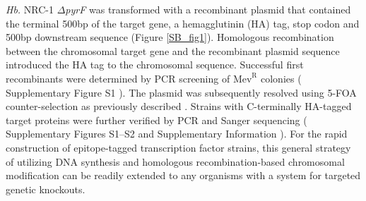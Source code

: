 {\em Hb.} NRC-1 $\Delta${\em pyrF} was transformed with a recombinant plasmid that contained the terminal 500bp of the target gene, a hemagglutinin (HA) tag, stop codon and 500bp downstream sequence (Figure \ref{SB_fig1}). Homologous recombination between the chromosomal target gene and the recombinant plasmid sequence introduced the HA tag to the chromosomal sequence. Successful first recombinants were determined by PCR screening of $\mbox{Mev}^\mbox{R}$ colonies ( Supplementary Figure S1 ). The plasmid was subsequently resolved using 5-FOA counter-selection as previously described \cite{kaur_systems_2006,peck_homologous_2000}. Strains with C-terminally HA-tagged target proteins were further verified by PCR and Sanger sequencing ( Supplementary Figures S1–S2 and Supplementary Information ). For the rapid construction of epitope-tagged transcription factor strains, this general strategy of utilizing DNA synthesis and homologous recombination-based chromosomal modification can be readily extended to any organisms with a system for targeted genetic knockouts.

